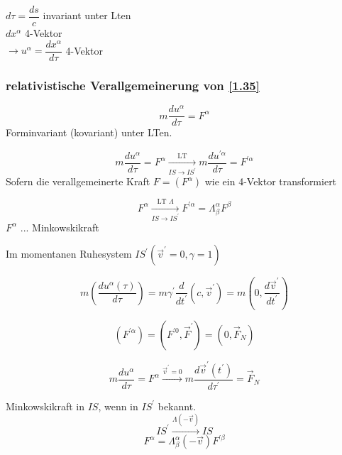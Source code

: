 \documentclass[a4paper, 11pt]{article}
\numberwithin{equation}{section}
\begin{document}
$d\tau = \dfrac{ds}{c}$ invariant unter Lten \\
$dx^\alpha$ 4-Vektor \\
$\rightarrow u^\alpha = \dfrac{dx^\alpha}{d\tau}$ 4-Vektor

\subsubsection*{relativistische Verallgemeinerung von \ref{1.35}}

\begin{equation}
m \dfrac{du^\alpha}{d\tau} = F^\alpha
\end{equation}
Forminvariant (kovariant) unter LTen.

\begin{equation}
m \dfrac{du^\alpha}{d\tau} = F^\alpha \xrightarrow[IS \rightarrow IS^\prime]{\text{LT}} m \dfrac{du^{\prime \alpha}}{d\tau} = F^{\prime \alpha}
\end{equation}
Sofern die verallgemeinerte Kraft $F = (F^\alpha)$ wie ein 4-Vektor transformiert

\begin{equation}
F^\alpha \xrightarrow[IS \rightarrow IS^\prime]{\text{LT } \Lambda} F^{\prime \alpha} = \Lambda^\alpha_\beta F^\beta
\end{equation}
$F^\alpha$ ... Minkowskikraft


Im momentanen Ruhesystem $IS^\prime (\vec{v}^\prime = 0, \gamma = 1)$

\begin{equation}
m \left( \dfrac{du^\alpha(\tau)}{d\tau} \right) = m \gamma^\prime \dfrac{d}{dt^\prime} (c,\vec{v}^\prime) = m \left( 0, \dfrac{d\vec{v}^\prime}{dt^\prime} \right) 
\end{equation}


\begin{equation}
\left(F^{\prime\alpha} \right) = \left(F^{\prime0}, \vec{F}^\prime \right) = \left( 0, \vec{F}_N \right)
\end{equation}

\begin{equation*}
m \dfrac{du^\alpha}{d\tau} = F^\alpha \xrightarrow{\vec{v}^\prime = 0} m \dfrac{d\vec{v}^\prime(t^\prime)}{d\tau^\prime} = \vec{F}_N
\end{equation*}

Minkowskikraft in $IS$, wenn in $IS^\prime$ bekannt.
\begin{equation*}
IS^\prime \xrightarrow{\Lambda(-\vec{v})} IS
\end{equation*}
\begin{equation}
F^\alpha = \Lambda^\alpha_\beta(-\vec{v}) F^{\prime \beta}
\end{equation}
\end{document}
